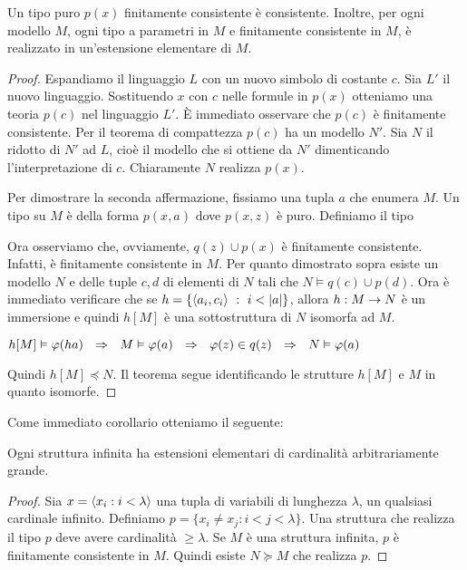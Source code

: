 \begin{theorem}\label{compattezzatipi}
Un tipo puro $p(x)$ finitamente consistente \`e consistente. Inoltre, per ogni modello $M$, ogni tipo a parametri in $M$ e finitamente consistente in $M$, \`e realizzato in un'estensione elementare di $M$. 
\end{theorem}

\begin{proof}
 
Espandiamo il linguaggio $L$ con un nuovo simbolo di costante $c$. Sia $L'$ il nuovo linguaggio. Sostituendo $x$ con $c$ nelle formule in $p(x)$ otteniamo una teoria $p(c)$ nel linguaggio $L'$. \`E immediato osservare che $p(c)$ \`e finitamente consistente. Per il teorema di compattezza $p(c)$ ha un modello $N'$. Sia $N$ il ridotto di $N'$ ad $L$, cio\`e il modello che si ottiene da $N'$ dimenticando l'interpretazione di $c$.  Chiaramente $N$ realizza $p(x)$. 

Per dimostrare la seconda affermazione, fissiamo una tupla $a$ che enumera $M$. Un tipo su $M$ \`e della forma $p(x,a)$ dove $p(x,z)$ \`e puro. Definiamo il tipo


Ora osserviamo che, ovviamente, $q(z)\cup p(x)$ \`e finitamente consistente. Infatti, \`e finitamente consistente in $M$. Per quanto dimostrato sopra esiste un modello $N$ e delle tuple $c,d$ di elementi di $N$ tali che $N\models q(c)\cup p(d)$. Ora \`e immediato verificare che se $h=\{\<a_i,c_i\>\ :\ i<|a|\}$, allora $h:M\rightarrow N$ \`e un immersione e quindi $h[M]$ \`e una sottostruttura di $N$ isomorfa ad $M$.

\hfil $h[M]\vDash\varphi(ha)\ \ \Rightarrow\ \  M\vDash \varphi(a)\ \  \Rightarrow\ \  \varphi(z)\in q(z)\ \   \Rightarrow\ \  N\vDash \varphi(a)$

Quindi $h[M]\preceq N$. Il teorema segue identificando le strutture $h[M]$ e $M$ in quanto isomorfe.
\end{proof}

Come immediato corollario otteniamo il seguente:

\begin{theorem}
Ogni struttura infinita ha estensioni elementari di cardinalit\`a arbitrariamente grande.
\end{theorem}

\begin{proof}
Sia $x=\langle x_i:i<\lambda\rangle$ una tupla di variabili di lunghezza $\lambda$, un qualsiasi cardinale infinito. Definiamo $p=\big\{x_i\neq x_j: i<j<\lambda\big\}$. Una struttura che realizza il tipo $p$ deve avere cardinalit\`a $\ge\lambda$. Se $M$ \`e una struttura infinita, $p$ \`e finitamente consistente in $M$. Quindi esiste $N\succeq M$ che realizza $p$.
\end{proof}



